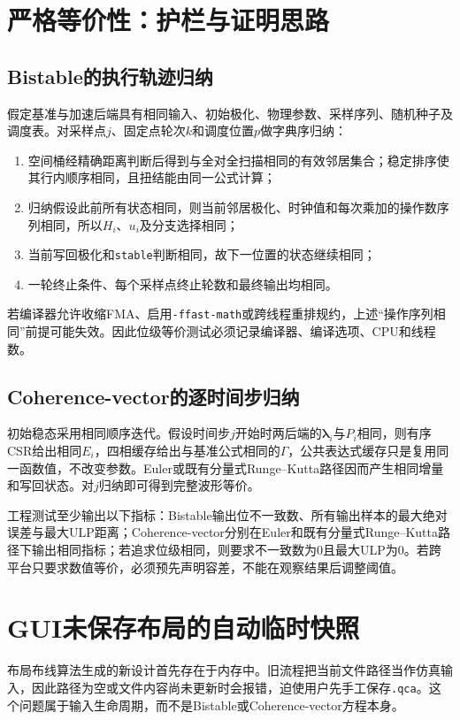 \documentclass[UTF8,a4paper,11pt]{ctexart}
\newcommand{\csr}{\textsc{CSR}}
\begin{document}
\section{严格等价性：护栏与证明思路}

\subsection{Bistable的执行轨迹归纳}

假定基准与加速后端具有相同输入、初始极化、物理参数、采样序列、随机种子及调度表。对采样点$j$、固定点轮次$k$和调度位置$p$做字典序归纳：
\begin{enumerate}
  \item 空间桶经精确距离判断后得到与全对全扫描相同的有效邻居集合；稳定排序使其行内顺序相同，且扭结能由同一公式计算；
  \item 归纳假设此前所有状态相同，则当前邻居极化、时钟值和每次乘加的操作数序列相同，所以$H_i$、$u_i$及分支选择相同；
  \item 当前写回极化和\texttt{stable}判断相同，故下一位置的状态继续相同；
  \item 一轮终止条件、每个采样点终止轮数和最终输出均相同。
\end{enumerate}
若编译器允许收缩FMA、启用\texttt{-ffast-math}或跨线程重排规约，上述“操作序列相同”前提可能失效。因此位级等价测试必须记录编译器、编译选项、CPU和线程数。

\subsection{Coherence-vector的逐时间步归纳}

初始稳态采用相同顺序迭代。假设时间步$j$开始时两后端的$\bm\lambda_i$与$P_i$相同，则有序\csr{}给出相同$E_i$，四相缓存给出与基准公式相同的$\Gamma$，公共表达式缓存只是复用同一函数值，不改变参数。Euler或既有分量式Runge--Kutta路径因而产生相同增量和写回状态。对$j$归纳即可得到完整波形等价。

工程测试至少输出以下指标：Bistable输出位不一致数、所有输出样本的最大绝对误差与最大ULP距离；Coherence-vector分别在Euler和既有分量式Runge--Kutta路径下输出相同指标；若追求位级相同，则要求不一致数为0且最大ULP为0。若跨平台只要求数值等价，必须预先声明容差，不能在观察结果后调整阈值。

\section{GUI未保存布局的自动临时快照}

布局布线算法生成的新设计首先存在于内存中。旧流程把当前文件路径当作仿真输入，因此路径为空或文件内容尚未更新时会报错，迫使用户先手工保存\texttt{.qca}。这个问题属于输入生命周期，而不是Bistable或Coherence-vector方程本身。
\end{document}
